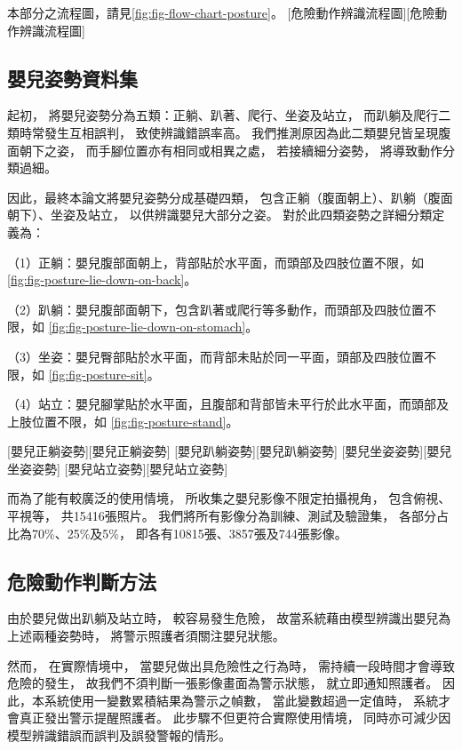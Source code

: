 \documentclass[class=NCU_thesis, crop=false]{standalone}
\begin{document}
本部分之流程圖，請見\cref{fig:fig-flow-chart-posture}。
[危險動作辨識流程圖][危險動作辨識流程圖]

\subsection{嬰兒姿勢資料集}

起初，
將嬰兒姿勢分為五類：正躺、趴著、爬行、坐姿及站立，
而趴躺及爬行二類時常發生互相誤判，
致使辨識錯誤率高。
我們推測原因為此二類嬰兒皆呈現腹面朝下之姿，
而手腳位置亦有相同或相異之處，
若接續細分姿勢，
將導致動作分類過細。

因此，最終本論文將嬰兒姿勢分成基礎四類，
包含正躺（腹面朝上）、趴躺（腹面朝下）、坐姿及站立，
以供辨識嬰兒大部分之姿。
對於此四類姿勢之詳細分類定義為：

（1）正躺：嬰兒腹部面朝上，背部貼於水平面，而頭部及四肢位置不限，如
\cref{fig:fig-posture-lie-down-on-back}。

（2）趴躺：嬰兒腹部面朝下，包含趴著或爬行等多動作，而頭部及四肢位置不限，如
\cref{fig:fig-posture-lie-down-on-stomach}。

（3）坐姿：嬰兒臀部貼於水平面，而背部未貼於同一平面，頭部及四肢位置不限，如
\cref{fig:fig-posture-sit}。

（4）站立：嬰兒腳掌貼於水平面，且腹部和背部皆未平行於此水平面，而頭部及上肢位置不限，如
\cref{fig:fig-posture-stand}。

[嬰兒正躺姿勢][嬰兒正躺姿勢]
[嬰兒趴躺姿勢][嬰兒趴躺姿勢]
[嬰兒坐姿姿勢][嬰兒坐姿姿勢]
[嬰兒站立姿勢][嬰兒站立姿勢]

而為了能有較廣泛的使用情境，
所收集之嬰兒影像不限定拍攝視角，
包含俯視、平視等，
共15416張照片。
我們將所有影像分為訓練、測試及驗證集，
各部分占比為70\%、25\%及5\%，
即各有10815張、3857張及744張影像。

\subsection{危險動作判斷方法}
由於嬰兒做出趴躺及站立時，
較容易發生危險，
故當系統藉由模型辨識出嬰兒為上述兩種姿勢時，
將警示照護者須關注嬰兒狀態。

然而，
在實際情境中，
當嬰兒做出具危險性之行為時，
需持續一段時間才會導致危險的發生，
故我們不須判斷一張影像畫面為警示狀態，
就立即通知照護者。
因此，本系統使用一變數累積結果為警示之幀數，
當此變數超過一定值時，
系統才會真正發出警示提醒照護者。
此步驟不但更符合實際使用情境，
同時亦可減少因模型辨識錯誤而誤判及誤發警報的情形。
\end{document}

